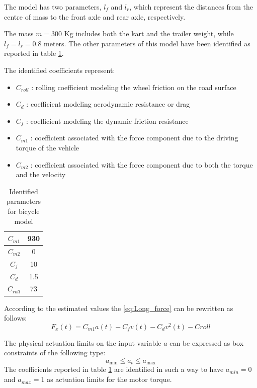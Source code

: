 \documentclass[a4paper,12pt,oneside]{book}
\begin{document}
\bigskip
The model has two parameters, $l_f$ and $l_r$, which represent the distances from the centre of mass to the front axle and rear axle, respectively.

The mass $m = 300$ Kg includes both the kart and the trailer weight, while $l_f = l_r = 0.8$ meters.
The other parameters of this model have been identified as reported in table \ref{tab:Parameters}.


\bigskip
The identified coefficients represent:
\begin{itemize}
    \item $C_{roll}$ : rolling coefficient modeling the wheel friction on the road surface
    \item $C_d$ : coefficient modeling aerodynamic resistance or drag
    \item $C_f$ : coefficient modeling the dynamic friction resistance
    \item $C_{m1}$ : coefficient associated with the force component due to the driving torque of the vehicle
    \item $C_{m2}$ : coefficient associated with the force component due to both the torque and the velocity
\end{itemize}

\begin{table}[h!]
    \centering
    \begin{tabular}{|c|c|}
        \hline
        $C_{m1}$ & 930 \\
        \hline
        $C_{m2}$ & 0 \\
        \hline
        $C_f$ & 10 \\
        \hline
        $C_d$ & 1.5 \\
        \hline
        $C_{roll}$ & 73 \\
        \hline
    \end{tabular}
    \caption{Identified parameters for bicycle model}
    \label{tab:Parameters}
\end{table}

According to the estimated values the \eqref{eq:Long_force} can be rewritten as follows:
\begin{equation}
    F_x(t) = C_{m1} a(t) - C_f v(t) - C_d v^2(t) - Croll
\end{equation}

The physical actuation limits on the input variable $a$ can be expressed as box constraints of the following type:
\begin{equation}
    a_{\text{min}} \leq a_t \leq a_{\text{max}}
\label{Input_limits}
\end{equation}
The coefficients reported in table \ref{tab:Parameters} are identified in such a way to have $a_{min} = 0$ and $a_{max} = 1$ as actuation limits for the motor torque.
\end{document}
